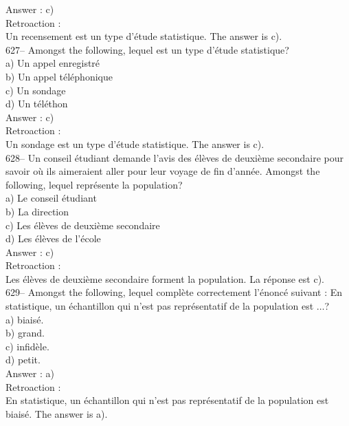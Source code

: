 ﻿\documentclass[letterpaper, 12pt]{article}
\begin{document}
Answer : c)\\

Retroaction : \\
Un recensement est un type d'\'etude statistique.  The answer is
c).\\

627-- Amongst the following, lequel est un type d'\'etude
statistique?\\
a) Un appel enregistr\'e\\
b) Un appel t\'el\'ephonique\\
c) Un sondage\\
d) Un t\'el\'ethon\\

Answer : c)\\

Retroaction : \\
Un sondage est un type d'\'etude statistique.  The answer is c).\\

628-- Un conseil \'etudiant demande l'avis des \'el\`eves de deuxi\`eme
secondaire pour savoir o\`u ils aimeraient aller pour leur voyage de fin
d'ann\'ee.  Amongst the following, lequel repr\'esente la
population?\\
a) Le conseil \'etudiant\\
b) La direction\\
c) Les \'el\`eves de deuxi\`eme secondaire\\
d) Les \'el\`eves de l'\'ecole\\

Answer : c)\\

Retroaction : \\
Les \'el\`eves de deuxi\`eme secondaire forment la population.  La r\'eponse
est c).\\

629-- Amongst the following, lequel compl\`ete
correctement l'\'enonc\'e suivant : \og En statistique, un
\'echantillon qui n'est pas repr\'esentatif de la population est $\ldots$\fg ?\\
a) biais\'e.\\
b) grand.\\
c) infid\`ele.\\
d) petit.\\

Answer : a)\\

Retroaction : \\
En statistique, un \'echantillon qui n'est pas repr\'esentatif de la
population est biais\'e.  The answer is a).\\
\end{document}
